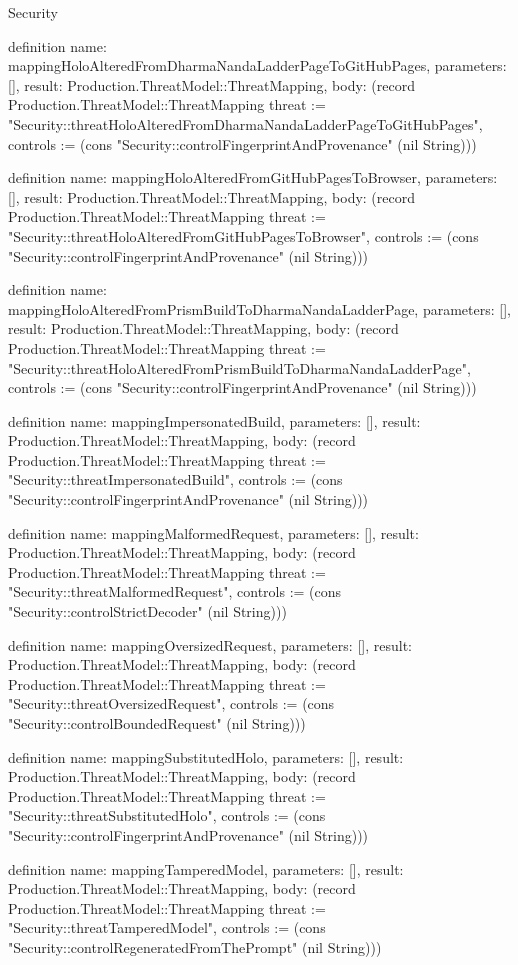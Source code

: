 \begin{lexlean}{Security}
\begin{semanticmodule}
definition{
  name: mappingHoloAlteredFromDharmaNandaLadderPageToGitHubPages,
  parameters: [],
  result: Production.ThreatModel::ThreatMapping,
  body: (record Production.ThreatModel::ThreatMapping {threat := "Security::threatHoloAlteredFromDharmaNandaLadderPageToGitHubPages", controls := (cons "Security::controlFingerprintAndProvenance" (nil String))})
}

definition{
  name: mappingHoloAlteredFromGitHubPagesToBrowser,
  parameters: [],
  result: Production.ThreatModel::ThreatMapping,
  body: (record Production.ThreatModel::ThreatMapping {threat := "Security::threatHoloAlteredFromGitHubPagesToBrowser", controls := (cons "Security::controlFingerprintAndProvenance" (nil String))})
}

definition{
  name: mappingHoloAlteredFromPrismBuildToDharmaNandaLadderPage,
  parameters: [],
  result: Production.ThreatModel::ThreatMapping,
  body: (record Production.ThreatModel::ThreatMapping {threat := "Security::threatHoloAlteredFromPrismBuildToDharmaNandaLadderPage", controls := (cons "Security::controlFingerprintAndProvenance" (nil String))})
}

definition{
  name: mappingImpersonatedBuild,
  parameters: [],
  result: Production.ThreatModel::ThreatMapping,
  body: (record Production.ThreatModel::ThreatMapping {threat := "Security::threatImpersonatedBuild", controls := (cons "Security::controlFingerprintAndProvenance" (nil String))})
}

definition{
  name: mappingMalformedRequest,
  parameters: [],
  result: Production.ThreatModel::ThreatMapping,
  body: (record Production.ThreatModel::ThreatMapping {threat := "Security::threatMalformedRequest", controls := (cons "Security::controlStrictDecoder" (nil String))})
}

definition{
  name: mappingOversizedRequest,
  parameters: [],
  result: Production.ThreatModel::ThreatMapping,
  body: (record Production.ThreatModel::ThreatMapping {threat := "Security::threatOversizedRequest", controls := (cons "Security::controlBoundedRequest" (nil String))})
}

definition{
  name: mappingSubstitutedHolo,
  parameters: [],
  result: Production.ThreatModel::ThreatMapping,
  body: (record Production.ThreatModel::ThreatMapping {threat := "Security::threatSubstitutedHolo", controls := (cons "Security::controlFingerprintAndProvenance" (nil String))})
}

definition{
  name: mappingTamperedModel,
  parameters: [],
  result: Production.ThreatModel::ThreatMapping,
  body: (record Production.ThreatModel::ThreatMapping {threat := "Security::threatTamperedModel", controls := (cons "Security::controlRegeneratedFromThePrompt" (nil String))})
}


\end{semanticmodule}
\end{lexlean}
